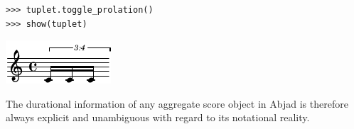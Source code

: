 \begin{lstlisting}
>>> tuplet.toggle_prolation()
>>> show(tuplet)
\end{lstlisting}

\includegraphics[scale=1.0]{images/notational_isomorphism-6.pdf}


The durational information of any aggregate score object in Abjad is therefore
always explicit and unambiguous with regard to its notational reality.